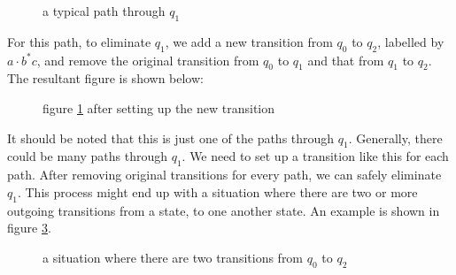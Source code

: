 \documentclass[11pt]{article}
\begin{document}
\begin{figure}[ht]
    \centering
    \caption{a typical path through $q_1$}
    \label{fig:fig23}
\end{figure}

For this path, to eliminate $q_1$, we add a new transition from $q_0$ to
$q_2$, labelled by $a \cdot b^\ast c$, and remove the original transition
from $q_0$ to $q_1$ and that from $q_1$ to $q_2$. The resultant figure is
shown below:

\begin{figure}[ht]
    \centering
    \caption{figure \ref{fig:fig23} after setting up the new transition}
    \label{fig:fig24}
\end{figure}

It should be noted that this is just one of the paths through $q_1$.
Generally, there could be many paths through $q_1$. We need to set up a
transition like this for each path. After removing original transitions
for every path, we can safely eliminate $q_1$. This process might end up
with a situation where there are two or more outgoing transitions from a
state, to one another state. An example is shown in figure \ref{fig:fig25}.

\begin{figure}[ht]
    \centering
    \caption{a situation where there are two transitions from $q_0$ to $q_2$}
    \label{fig:fig25}
\end{figure}
\end{document}
